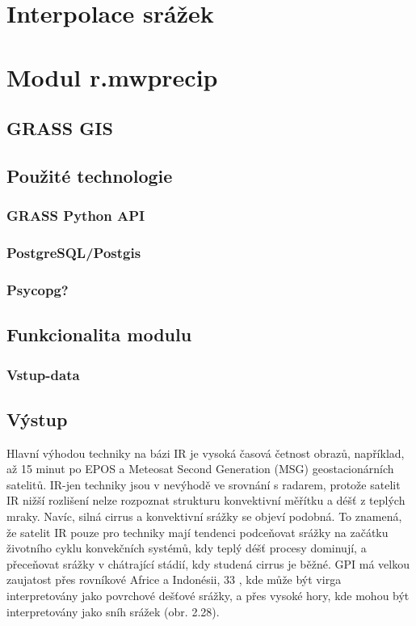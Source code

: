 \documentclass[a4paper,12pt]{article}
\begin{document}
\section{Interpolace srážek}

\section{Modul r.mwprecip}
\subsection{GRASS GIS}
\subsection{Použité technologie}
\subsubsection{GRASS Python API}
\subsubsection{PostgreSQL/Postgis}
\subsubsection{Psycopg?}
\subsection{Funkcionalita modulu}
\subsubsection{Vstup-data}   
\subsection{Výstup}
Hlavní výhodou techniky na bázi IR je vysoká časová četnost obrazů, například, až 15 minut po EPOS a Meteosat Second Generation (MSG) geostacionárních satelitů. IR-jen techniky jsou v nevýhodě ve srovnání s radarem, protože satelit IR nižší rozlišení nelze rozpoznat strukturu konvektivní měřítku a déšť z teplých mraky. Navíc, silná cirrus a konvektivní srážky se objeví podobná. To znamená, že satelit IR pouze pro techniky mají tendenci podceňovat srážky na začátku životního cyklu konvekčních systémů, kdy teplý déšť procesy dominují, a přeceňovat srážky v chátrající stádií, kdy studená cirrus je běžné. GPI má velkou zaujatost přes rovníkové Africe a Indonésii, 33 , kde může být virga interpretovány jako povrchové dešťové srážky, a přes vysoké hory, kde mohou být interpretovány jako sníh srážek (obr. 2.28).
\end{document}
